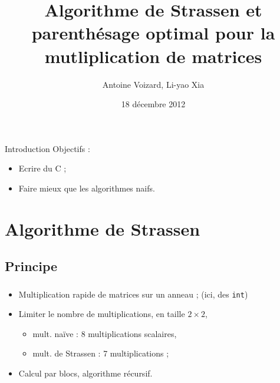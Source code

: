 \documentclass{beamer}
\title[Projet de programmation et d'algorithmique]{
Algorithme de Strassen et parenthésage optimal
pour la mutliplication de matrices}
\author{Antoine Voizard, Li-yao Xia}
\date{18 décembre 2012}
\begin{document}
\begin{frame}
\titlepage
\end{frame}


\begin{frame}{Introduction}
  Objectifs :
  \begin{itemize}
    \item Ecrire du C ;
    \item Faire mieux que les algorithmes naifs.
  \end{itemize}
\end{frame}

\section{Algorithme de Strassen}

\subsection{Principe}
\begin{frame}[fragile]
  \frametitle{\insertsubsection}
  \begin{itemize}
    \item Multiplication rapide de matrices sur un anneau ;
    (ici, des \verb=int=)
    \item Limiter le nombre de multiplications, en taille $2 \times 2$,
    \begin{itemize}
      \item mult. naïve : 8 multiplications scalaires,
      \item mult. de Strassen : 7 multiplications ;
    \end{itemize}
    \item Calcul par blocs, algorithme récursif.
  \end{itemize}
\end{frame}
\end{document}
